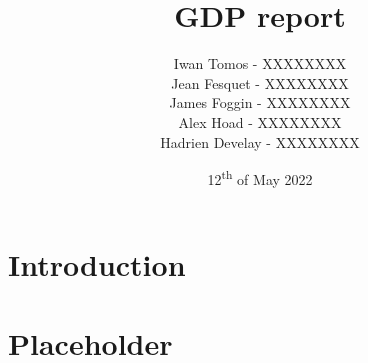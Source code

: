 \documentclass{article}
\title{GDP report}
\author{
    Iwan Tomos - XXXXXXXX\\
    Jean Fesquet - XXXXXXXX\\
    James Foggin - XXXXXXXX\\
    Alex Hoad - XXXXXXXX\\
    Hadrien Develay - XXXXXXXX
}
\date{12\textsuperscript{th} of May 2022}
\begin{document}
\maketitle

\section{Introduction}


\section{Placeholder}

\end{document}

